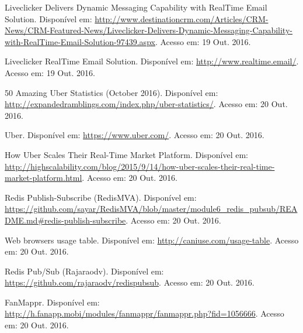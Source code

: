 \documentclass[brazil,ruledheader]{abntifes}
\begin{document}
	\tableofcontents{}
	
	
	
	
	
	
	
	
	
	
	
	
	\begin{thebibliography}{9}
		Liveclicker Delivers Dynamic Messaging Capability with RealTime Email Solution. Disponível em: \url{http://www.destinationcrm.com/Articles/CRM-News/CRM-Featured-News/Liveclicker-Delivers-Dynamic-Messaging-Capability-with-RealTime-Email-Solution-97439.aspx}.
		Acesso em: 19 Out. 2016.
		
		Liveclicker RealTime Email Solution. Disponível em: \url{http://www.realtime.email/}.
		Acesso em: 19 Out. 2016.
		
		50 Amazing Uber Statistics (October 2016). Disponível em: \url{http://expandedramblings.com/index.php/uber-statistics/}.
		Acesso em: 20 Out. 2016.
		
		Uber. Disponível em: \url{https://www.uber.com/}.
		Acesso em: 20 Out. 2016.
		
		How Uber Scales Their Real-Time Market Platform. Disponível em: \url{http://highscalability.com/blog/2015/9/14/how-uber-scales-their-real-time-market-platform.html}.
		Acesso em: 20 Out. 2016.
		
		Redis Publish-Subscribe (RedisMVA). Disponível em: \url{https://github.com/sayar/RedisMVA/blob/master/module6_redis_pubsub/README.md#redis-publish-subscribe}.
		Acesso em: 20 Out. 2016.
		
		Web browsers usage table. Disponível em: \url{http://caniuse.com/usage-table}.
		Acesso em: 20 Out. 2016.
		
		Redis Pub/Sub (Rajaraodv). Disponível em: \url{https://github.com/rajaraodv/redispubsub}.
		Acesso em: 20 Out. 2016.
		
		FanMappr. Disponível em: \url{http://h.fanapp.mobi/modules/fanmappr/fanmappr.php?fid=1056666}.
		Acesso em: 20 Out. 2016.
		

\end{thebibliography}
\end{document}
